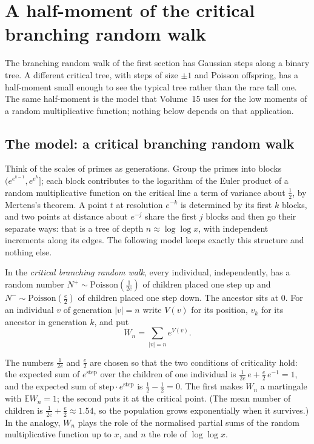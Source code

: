 \section{A half-moment of the critical branching random walk}

The branching random walk of the first section has Gaussian steps along a binary tree. A different critical tree, with steps of size $\pm1$ and Poisson offspring, has a half-moment small enough to see the typical tree rather than the rare tall one. The same half-moment is the model that Volume~15 uses for the low moments of a random multiplicative function; nothing below depends on that application.

\subsection*{The model: a critical branching random walk}

Think of the scales of primes as generations. Group the primes into blocks $(e^{e^{k-1}},e^{e^k}]$; each block contributes to the logarithm of the Euler product of a random multiplicative function on the critical line a term of variance about $\frac12$, by Mertens's theorem. A point $t$ at resolution $e^{-k}$ is determined by its first $k$ blocks, and two points at distance about $e^{-j}$ share the first $j$ blocks and then go their separate ways: that is a tree of depth $n\approx\log\log x$, with independent increments along its edges. The following model keeps exactly this structure and nothing else.

\begin{definition}\label{def:brw}
In the \emph{critical branching random walk}, every individual, independently, has a random number $N^+\sim\mathrm{Poisson}(\frac1{2e})$ of children placed one step up and $N^-\sim\mathrm{Poisson}(\frac e2)$ of children placed one step down. The ancestor sits at $0$. For an individual $v$ of generation $|v|=n$ write $V(v)$ for its position, $v_k$ for its ancestor in generation $k$, and put
\[
W_n=\sum_{|v|=n}e^{V(v)}.
\]
\end{definition}

The numbers $\frac1{2e}$ and $\frac e2$ are chosen so that the two conditions of criticality hold: the expected sum of $e^{\text{step}}$ over the children of one individual is $\frac1{2e}\,e+\frac e2\,e^{-1}=1$, and the expected sum of $\text{step}\cdot e^{\text{step}}$ is $\frac12-\frac12=0$. The first makes $W_n$ a martingale with $\mathbb EW_n=1$; the second puts it at the critical point. (The mean number of children is $\frac1{2e}+\frac e2\approx1.54$, so the population grows exponentially when it survives.) In the analogy, $W_n$ plays the role of the normalised partial sums of the random multiplicative function up to $x$, and $n$ the role of $\log\log x$.

